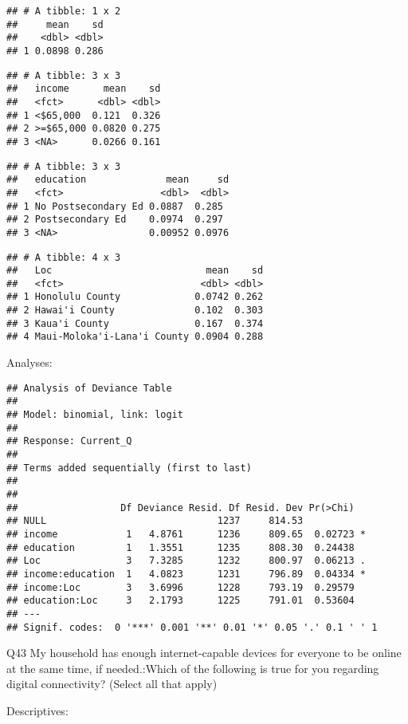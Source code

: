 \documentclass[]{article}
\begin{document}
\begin{verbatim}
## # A tibble: 1 x 2
##     mean    sd
##    <dbl> <dbl>
## 1 0.0898 0.286
\end{verbatim}

\begin{verbatim}
## # A tibble: 3 x 3
##   income      mean    sd
##   <fct>      <dbl> <dbl>
## 1 <$65,000  0.121  0.326
## 2 >=$65,000 0.0820 0.275
## 3 <NA>      0.0266 0.161
\end{verbatim}

\begin{verbatim}
## # A tibble: 3 x 3
##   education              mean     sd
##   <fct>                 <dbl>  <dbl>
## 1 No Postsecondary Ed 0.0887  0.285 
## 2 Postsecondary Ed    0.0974  0.297 
## 3 <NA>                0.00952 0.0976
\end{verbatim}

\begin{verbatim}
## # A tibble: 4 x 3
##   Loc                           mean    sd
##   <fct>                        <dbl> <dbl>
## 1 Honolulu County             0.0742 0.262
## 2 Hawai'i County              0.102  0.303
## 3 Kaua'i County               0.167  0.374
## 4 Maui-Moloka'i-Lana'i County 0.0904 0.288
\end{verbatim}

Analyses:

\begin{verbatim}
## Analysis of Deviance Table
## 
## Model: binomial, link: logit
## 
## Response: Current_Q
## 
## Terms added sequentially (first to last)
## 
## 
##                  Df Deviance Resid. Df Resid. Dev Pr(>Chi)  
## NULL                              1237     814.53           
## income            1   4.8761      1236     809.65  0.02723 *
## education         1   1.3551      1235     808.30  0.24438  
## Loc               3   7.3285      1232     800.97  0.06213 .
## income:education  1   4.0823      1231     796.89  0.04334 *
## income:Loc        3   3.6996      1228     793.19  0.29579  
## education:Loc     3   2.1793      1225     791.01  0.53604  
## ---
## Signif. codes:  0 '***' 0.001 '**' 0.01 '*' 0.05 '.' 0.1 ' ' 1
\end{verbatim}

Q43 My household has enough internet-capable devices for everyone to be
online at the same time, if needed.:Which of the following is true for
you regarding digital connectivity? (Select all that apply)

Descriptives:
\end{document}
